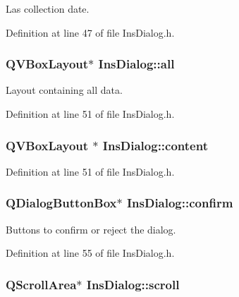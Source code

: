 Las collection date. 



Definition at line 47 of file Ins\+Dialog.\+h.

\hypertarget{class_ins_dialog_ab8de5f3cd72b44a3b3524fc52bac148c}{
\subsubsection[{all}]{\setlength{\rightskip}{0pt plus 5cm}Q\+V\+Box\+Layout$\ast$ Ins\+Dialog\+::all\hspace{0.3cm}{\ttfamily [private]}}}\label{class_ins_dialog_ab8de5f3cd72b44a3b3524fc52bac148c}


Layout containing all data. 



Definition at line 51 of file Ins\+Dialog.\+h.

\hypertarget{class_ins_dialog_a9b0df6254c3f39e812bbeb0ef85c1d0c}{
\subsubsection[{content}]{\setlength{\rightskip}{0pt plus 5cm}Q\+V\+Box\+Layout $\ast$ Ins\+Dialog\+::content\hspace{0.3cm}{\ttfamily [private]}}}\label{class_ins_dialog_a9b0df6254c3f39e812bbeb0ef85c1d0c}


Definition at line 51 of file Ins\+Dialog.\+h.

\hypertarget{class_ins_dialog_aa77dfa096f7cd3bc82823f6944ecbd8b}{
\subsubsection[{confirm}]{\setlength{\rightskip}{0pt plus 5cm}Q\+Dialog\+Button\+Box$\ast$ Ins\+Dialog\+::confirm\hspace{0.3cm}{\ttfamily [private]}}}\label{class_ins_dialog_aa77dfa096f7cd3bc82823f6944ecbd8b}


Buttons to confirm or reject the dialog. 



Definition at line 55 of file Ins\+Dialog.\+h.

\hypertarget{class_ins_dialog_a822e0887cf9597f75ed5c4a772a8c9db}{
\subsubsection[{scroll}]{\setlength{\rightskip}{0pt plus 5cm}Q\+Scroll\+Area$\ast$ Ins\+Dialog\+::scroll\hspace{0.3cm}{\ttfamily [private]}}}\label{class_ins_dialog_a822e0887cf9597f75ed5c4a772a8c9db}


